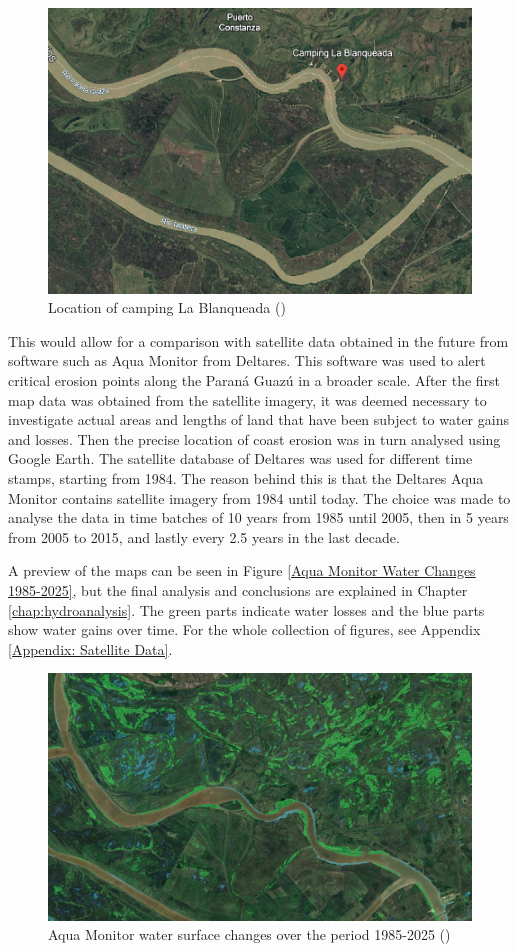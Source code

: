\begin{figure}[H]
    \centering
    \includegraphics[width=0.75\linewidth]{figures/ch5/Camping Blanqueada.png}
    \caption{Location of camping La Blanqueada (\cite{googleearth2025})}
    \label{fig:Camping Blanqueada}
\end{figure}

This would allow for a comparison with satellite data obtained in the future from software such as Aqua Monitor from Deltares. This software was used to alert critical erosion points along the Paraná Guazú in a broader scale. After the first map data was obtained from the satellite imagery, it was deemed necessary to investigate actual areas and lengths of land that have been subject to water gains and losses. Then the precise location of coast erosion was in turn analysed using Google Earth. The satellite database of Deltares was used for different time stamps, starting from 1984. The reason behind this is that the Deltares Aqua Monitor contains satellite imagery from 1984 until today. The choice was made to analyse the data in time batches of 10 years from 1985 until 2005, then in 5 years from 2005 to 2015, and lastly every 2.5 years in the last decade.

A preview of the maps can be seen in Figure \ref{Aqua Monitor Water Changes 1985-2025}, but the final analysis and conclusions are explained in Chapter \ref{chap:hydroanalysis}. The green parts indicate water losses and the blue parts show water gains over time. For the whole collection of figures, see Appendix \ref{Appendix: Satellite Data}.

\begin{figure}[H]
    \centering
    \includegraphics[width=0.75\linewidth]{figures/ch4/1985-2025.jpg}
    \caption{Aqua Monitor water surface changes over the period 1985-2025 (\cite{googleearth2025})}
\end{figure}
\label{Aqua Monitor Water Changes 1985-2025}

